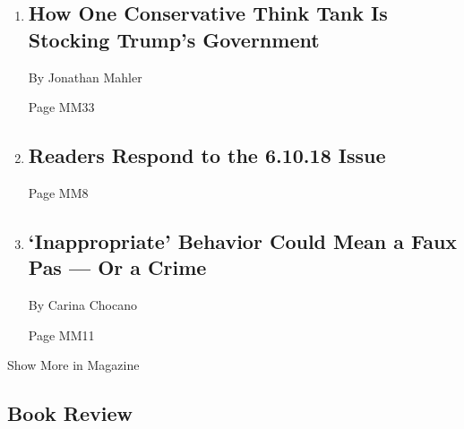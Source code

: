 \begin{enumerate}
\def\labelenumi{\arabic{enumi}.}
\item
  \href{/2018/06/20/magazine/trump-government-heritage-foundation-think-tank.html}{}

  \hypertarget{how-one-conservative-think-tank-is-stocking-trumps-government}{%
  \subsection{How One Conservative Think Tank Is Stocking Trump's
  Government}\label{how-one-conservative-think-tank-is-stocking-trumps-government}}

  By Jonathan Mahler

  Page MM33
\item
  \href{/2018/06/21/magazine/readers-respond-to-the-6-10-18-issue.html}{}

  \hypertarget{readers-respond-to-the-61018-issue}{%
  \subsection{Readers Respond to the 6.10.18
  Issue}\label{readers-respond-to-the-61018-issue}}

  Page MM8
\item
  \href{/2018/06/19/magazine/inappropriate-behavior-could-mean-a-faux-pas-or-a-crime.html}{}

  \hypertarget{inappropriate-behavior-could-mean-a-faux-pas--or-a-crime}{%
  \subsection{`Inappropriate' Behavior Could Mean a Faux Pas --- Or a
  Crime}\label{inappropriate-behavior-could-mean-a-faux-pas--or-a-crime}}

  By Carina Chocano

  Page MM11
\end{enumerate}

Show More in Magazine

\hypertarget{book-review}{%
\subsection{Book Review}\label{book-review}}


